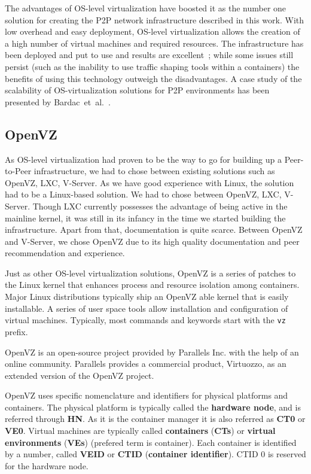 The advantages of OS-level virtualization have boosted it as the number one
solution for creating the P2P network infrastructure described in this work.
With low overhead and easy deployment, OS-level virtualization allows the
creation of a high number of virtual machines and required resources. The
infrastructure has been deployed and put to use and results are
excellent~\cite{p2p-va};
while some issues still persist (such as the inability to use traffic shaping
tools within a containers) the benefits of using this technology outweigh the
disadvantages. A case study of the scalability of OS-virtualization solutions
for P2P environments has been presented by
Bardac~et~al.~\cite{p2p-virt-scaling}.

\subsection{OpenVZ}

As OS-level virtualization had proven to be the way to go for building up a
Peer-to-Peer infrastructure, we had to chose between existing solutions such
as OpenVZ, LXC, V-Server. As we have good experience with Linux, the solution
had to be a Linux-based solution. We had to chose between OpenVZ, LXC,
V-Server. Though LXC currently possesses the advantage of being active in the
mainline kernel, it was still in its infancy in the time we started building
the infrastructure. Apart from that, documentation is quite scarce. Between
OpenVZ and V-Server, we chose OpenVZ due to its high quality documentation
and peer recommendation and experience.

Just as other OS-level virtualization solutions, OpenVZ is a series of patches
to the Linux kernel that enhances process and resource isolation among
containers. Major Linux distributions typically ship an OpenVZ able kernel that
is easily installable. A series of user space tools allow installation and
configuration of virtual machines. Typically, most commands and keywords start
with the \texttt{vz} prefix.

OpenVZ is an open-source project provided by Parallels Inc. with the help of
an online community. Parallels provides a commercial product, Virtuozzo, as an
extended version of the OpenVZ project.

OpenVZ uses specific nomenclature and identifiers for physical platforms and
containers. The physical platform is typically called the \textbf{hardware
node}, and is referred through \textbf{HN}. As it is the container manager it
is also referred as \textbf{CT0} or \textbf{VE0}. Virtual machines are
typically called \textbf{containers} (\textbf{CTs}) or \textbf{virtual
environments} (\textbf{VEs}) (prefered term is container). Each container is
identified by a number, called \textbf{VEID} or \textbf{CTID}
(\textbf{container identifier}). CTID 0 is reserved for the hardware node.

